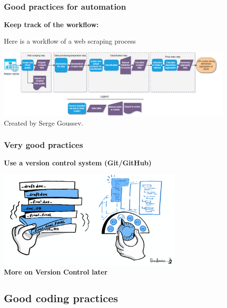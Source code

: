 \documentclass[xcolor=x11names,compress, aspectratio=169]{beamer}
\renewcommand{\(}{\begin{columns}}
\renewcommand{\)}{\end{columns}}
\newcommand{\<}[1]{\begin{column}{#1}}
\renewcommand{\>}{\end{column}}
\begin{document}
\begin{frame}
\frametitle{\textbf{Good practices for  automation} }
\textcolor{siap}{\textbf{Keep track of the workflow:} \\  }

Here is a workflow of a  web scraping process \\
\begin{center}
\href{https://github.com/sergegoussev/ESCAP_RAP_class/blob/main/docs/images/ads-process-overview-high-level-overview.drawio.svg}
{\includegraphics[width=0.9\textwidth]{ESCAPWebScrappingPipeline.png}} \\
\hfill \tiny{ \textcolor{gris}{Created by Serge Goussev.}}
\end{center}

\end{frame}

\begin{frame}
\frametitle{\textbf{Very good practices} }
\textcolor{siap}{\textbf{Use a version control system  (Git/GitHub)}} \\
\vspace{0.5cm}
\begin{center}
 \includegraphics[width=0.7\textwidth]{FileHistory.PNG} \\

\large{\textbf{ More on Version Control later }}

\end{center}
\end{frame}

\subsection{Good coding practices}
\end{document}
